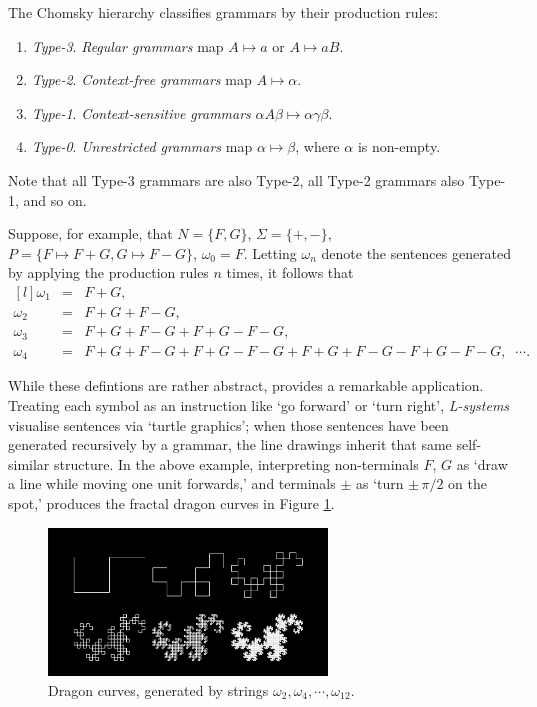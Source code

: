 \documentclass[a4paper, 11pt]{article}
\begin{document}
\begin{flushleft}
\vspace{5pt}\noindent
The Chomsky hierarchy \citep{chomskyHierarchy} %
classifies grammars by their production rules:
\begin{enumerate}[label=]
\item \textit{Type-3}. \textit{Regular grammars} map $A \mapsto a$ or $A \mapsto aB$.
\item \textit{Type-2}. \textit{Context-free grammars} map $A \mapsto \alpha$.
\item \textit{Type-1}. \textit{Context-sensitive grammars} $\alpha A\beta \mapsto \alpha\gamma\beta$.
\item \textit{Type-0}. \textit{Unrestricted grammars} map $\alpha \mapsto \beta$, where $\alpha$ is non-empty.
\end{enumerate}
Note that all Type-3 grammars are also Type-2, all Type-2 grammars also Type-1, and so on.

\vspace{5pt}\noindent
Suppose, for example, that $N = \{F, G\}$, $\Sigma = \{+, -\}$, $P = \{F \mapsto F+G, G \mapsto F-G\}$, $\omega_0 = F$.
Letting $\omega_n$ denote the sentences generated by applying the production rules $n$ times, it follows that
$$\begin{matrix*}[l]
\omega_1 &= &F+G, \\
\omega_2 &= &F+G+F-G, \\
\omega_3 &= &F+G+F-G+F+G-F-G, \\
\omega_4 &= &F+G+F-G+F+G-F-G+F+G+F-G-F+G-F-G, \;\; \cdots.
\end{matrix*}$$

\vspace{5pt}\noindent
While these defintions are rather abstract, \citet{lindenmayerLSystems} provides a remarkable application. Treating each symbol as an instruction like `go forward' or `turn right', \textit{L-systems} visualise sentences via `turtle graphics'; when those sentences have been generated recursively by a grammar, the line drawings inherit that same self-similar structure. In the above example, interpreting non-terminals $F$, $G$ as `draw a line while moving one unit forwards,' and terminals $\pm$ as `turn $\pm\, \pi/2$ on the spot,' produces the fractal dragon curves in Figure \ref{Dragon Curves}.

\begin{figure}[h]
\centering
\includegraphics[width=0.66\textwidth]{Dragon Curves}
\caption{Dragon curves, generated by strings $\omega_2, \omega_4, \cdots, \omega_{12}$.}
\label{Dragon Curves}
\end{figure}


\end{flushleft}
\end{document}
